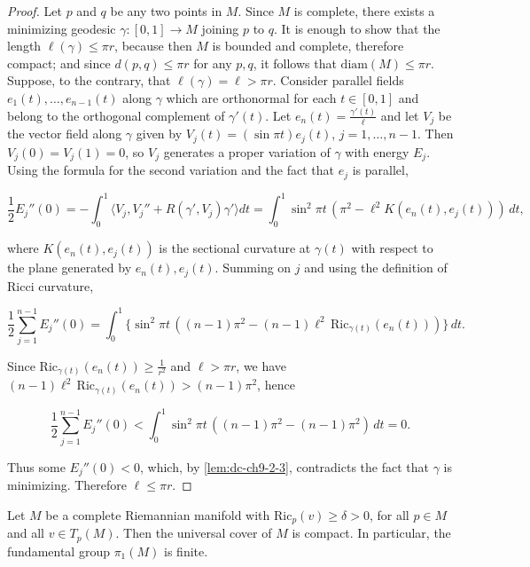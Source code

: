 \begin{proof}
  \sketch
  Let $p$ and $q$ be any two points in $M$. Since $M$ is complete, there
  exists a minimizing geodesic $\gamma:[0,1]\to M$ joining $p$ to $q$. It is enough
  to show that the length $\ell(\gamma)\le\pi r$, because then $M$ is bounded and
  complete, therefore compact; and since $d(p,q)\le\pi r$ for any $p,q$, it follows
  that $\mathrm{diam}(M)\le\pi r$. Suppose, to the contrary, that
  $\ell(\gamma)=\ell>\pi r$. Consider parallel fields $e_1(t),\dots,e_{n-1}(t)$ along
  $\gamma$ which are orthonormal for each $t\in[0,1]$ and belong to the orthogonal
  complement of $\gamma'(t)$. Let $e_n(t)=\frac{\gamma'(t)}{\ell}$ and let $V_j$ be
  the vector field along $\gamma$ given by $V_j(t)=(\sin\pi t)e_j(t)$,
  $j=1,\dots,n-1$. Then $V_j(0)=V_j(1)=0$, so $V_j$ generates a proper variation of
  $\gamma$ with energy $E_j$. Using the formula for the second variation and the fact
  that $e_j$ is parallel,

  $$
  \frac{1}{2}E_j''(0)=-\int_0^1\langle V_j,V_j''+R(\gamma',V_j)\gamma'\rangle dt=\int_0^1\sin^2\pi t\,(\pi^2-\ell^2 K(e_n(t),e_j(t)))\,dt,
  $$

  where $K(e_n(t),e_j(t))$ is the sectional curvature at $\gamma(t)$ with respect to
  the plane generated by $e_n(t),e_j(t)$. Summing on $j$ and using the definition of
  Ricci curvature,

  $$
  \frac{1}{2}\sum_{j=1}^{n-1}E_j''(0)=\int_0^1\{\sin^2\pi t\,((n-1)\pi^2-(n-1)\ell^2\,\mathrm{Ric}_{\gamma(t)}(e_n(t)))\}\,dt.
  $$

  Since $\mathrm{Ric}_{\gamma(t)}(e_n(t))\ge\frac{1}{r^2}$ and $\ell>\pi r$, we have
  $(n-1)\ell^2\,\mathrm{Ric}_{\gamma(t)}(e_n(t))>(n-1)\pi^2$, hence

  $$
  \frac{1}{2}\sum_{j=1}^{n-1}E_j''(0)<\int_0^1\sin^2\pi t\,((n-1)\pi^2-(n-1)\pi^2)\,dt=0.
  $$

  Thus some $E_j''(0)<0$, which, by \cref{lem:dc-ch9-2-3},
  contradicts the fact that $\gamma$ is minimizing. Therefore $\ell\le\pi r$.
\end{proof}
\begin{corollary}
  \label{cor:dc-ch9-3-2}
  Let $M$ be a complete Riemannian manifold with $\mathrm{Ric}_p(v)\ge\delta>0$, for
  all $p\in M$ and all $v\in T_p(M)$. Then the universal cover of $M$ is compact. In
  particular, the fundamental group $\pi_1(M)$ is finite.
\end{corollary}

